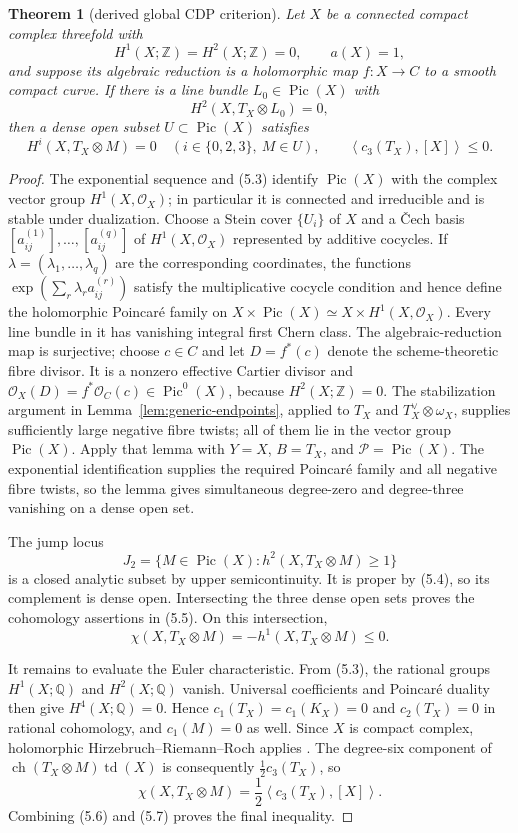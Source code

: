 \documentclass[11pt]{amsart}
\newcommand{\Z}{\mathbb Z}
\newcommand{\Q}{\mathbb Q}
\newcommand{\cO}{\mathcal O}
\newcommand{\Pic}{\operatorname{Pic}}
\theoremstyle{plain}
\newtheorem{theorem}{Theorem}[section]
\theoremstyle{definition}
\theoremstyle{remark}
\begin{document}
\begin{theorem}[derived global CDP criterion]
\label{thm:corrected-global}
Let $X$ be a connected compact complex threefold with
\[
 H^1(X;\Z)=H^2(X;\Z)=0,\qquad a(X)=1,
 \tag{5.3}
\]
and suppose its algebraic reduction is a holomorphic map $f:X\to C$ to a
smooth compact curve.  If there is a line bundle $L_0\in\Pic(X)$ with
\[
 H^2(X,T_X\otimes L_0)=0,
 \tag{5.4}
\]
then a dense open subset $U\subset\Pic(X)$ satisfies
\[
  H^i(X,T_X\otimes M)=0\quad(i\in\{0,2,3\},\ M\in U),
 \qquad
 \left\langle c_3(T_X),[X]\right\rangle\le0.
 \tag{5.5}
\]
\end{theorem}

\begin{proof}
The exponential sequence and (5.3) identify
\(\Pic(X)\) with the complex vector group $H^1(X,\cO_X)$; in particular it
is connected and irreducible and is stable under dualization.  Choose a Stein
cover $\{U_i\}$ of $X$ and a \v{C}ech basis
$[a^{(1)}_{ij}],\ldots,[a^{(q)}_{ij}]$ of $H^1(X,\cO_X)$ represented by additive
cocycles.  If $\lambda=(\lambda_1,\ldots,\lambda_q)$ are the corresponding
coordinates, the functions
$\exp(\sum_r\lambda_r a^{(r)}_{ij})$ satisfy the multiplicative cocycle
condition and hence define the holomorphic Poincar\'e family on
$X\times\Pic(X)\simeq X\times H^1(X,\cO_X)$.  Every
line bundle in it has vanishing integral
first Chern class.  The algebraic-reduction map is surjective; choose
$c\in C$ and let $D=f^*(c)$ denote the scheme-theoretic fibre divisor.  It is
a nonzero effective Cartier divisor and
\(\cO_X(D)=f^*\cO_C(c)\in\Pic^0(X)\), because $H^2(X;\Z)=0$.
  The stabilization argument in Lemma~\ref{lem:generic-endpoints}, applied
  to $T_X$ and $T_X^\vee\otimes\omega_X$, supplies sufficiently large
  negative fibre twists; all of them lie in the vector group $\Pic(X)$.
  Apply that lemma with $Y=X$, $B=T_X$, and $\mathcal P=\Pic(X)$.  The
  exponential identification supplies the required Poincar\'e family and all
  negative fibre twists, so the lemma gives simultaneous degree-zero and
  degree-three vanishing on a dense open set.

The jump locus
\[
 J_2=\{M\in\Pic(X):h^2(X,T_X\otimes M)\ge1\}
\]
is a closed analytic subset by upper semicontinuity.  It is proper by (5.4),
so its complement is dense open.  Intersecting the three dense open sets
proves the cohomology assertions in (5.5).  On this intersection,
\[
 \chi(X,T_X\otimes M)=-h^1(X,T_X\otimes M)\le0.
 \tag{5.6}
\]

It remains to evaluate the Euler characteristic.  From (5.3), the rational
groups $H^1(X;\Q)$ and $H^2(X;\Q)$ vanish.  Universal coefficients and
Poincar\'e duality then give $H^4(X;\Q)=0$.  Hence
  $c_1(T_X)=c_1(K_X)=0$ and $c_2(T_X)=0$ in rational cohomology, and
  $c_1(M)=0$ as well.  Since $X$ is
  compact complex, holomorphic Hirzebruch--Riemann--Roch applies \cite{Hir}.  The
degree-six component of
\(\operatorname{ch}(T_X\otimes M)\operatorname{td}(X)\) is consequently
\(\tfrac12c_3(T_X)\), so
\[
 \chi(X,T_X\otimes M)=
 \frac12\left\langle c_3(T_X),[X]\right\rangle.
 \tag{5.7}
\]
Combining (5.6) and (5.7) proves the final inequality.
\end{proof}
\end{document}
